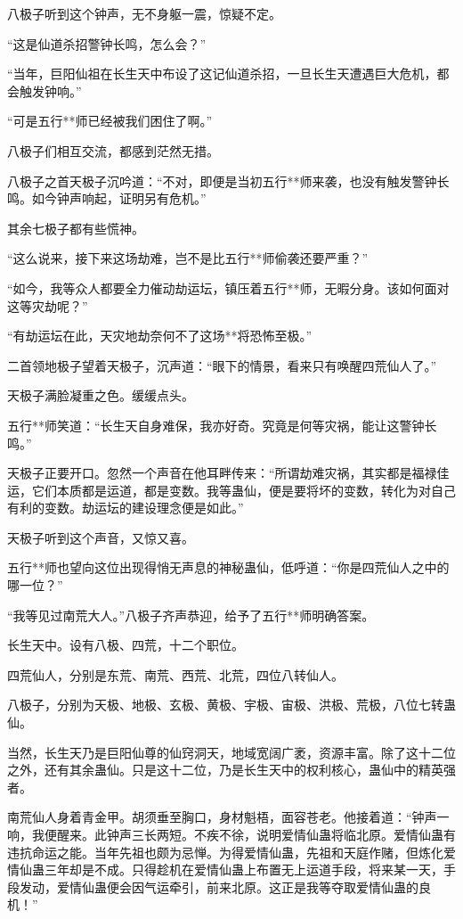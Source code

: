 \begin{this_body}
八极子听到这个钟声，无不身躯一震，惊疑不定。

“这是仙道杀招警钟长鸣，怎么会？”

“当年，巨阳仙祖在长生天中布设了这记仙道杀招，一旦长生天遭遇巨大危机，都会触发钟响。”

“可是五行**师已经被我们困住了啊。”

八极子们相互交流，都感到茫然无措。

八极子之首天极子沉吟道：“不对，即便是当初五行**师来袭，也没有触发警钟长鸣。如今钟声响起，证明另有危机。”

其余七极子都有些慌神。

“这么说来，接下来这场劫难，岂不是比五行**师偷袭还要严重？”

“如今，我等众人都要全力催动劫运坛，镇压着五行**师，无暇分身。该如何面对这等灾劫呢？”

“有劫运坛在此，天灾地劫奈何不了这场**将恐怖至极。”

二首领地极子望着天极子，沉声道：“眼下的情景，看来只有唤醒四荒仙人了。”

天极子满脸凝重之色。缓缓点头。

五行**师笑道：“长生天自身难保，我亦好奇。究竟是何等灾祸，能让这警钟长鸣。”

天极子正要开口。忽然一个声音在他耳畔传来：“所谓劫难灾祸，其实都是福禄佳运，它们本质都是运道，都是变数。我等蛊仙，便是要将坏的变数，转化为对自己有利的变数。劫运坛的建设理念便是如此。”

天极子听到这个声音，又惊又喜。

五行**师也望向这位出现得悄无声息的神秘蛊仙，低呼道：“你是四荒仙人之中的哪一位？”

“我等见过南荒大人。”八极子齐声恭迎，给予了五行**师明确答案。

长生天中。设有八极、四荒，十二个职位。

四荒仙人，分别是东荒、南荒、西荒、北荒，四位八转仙人。

八极子，分别为天极、地极、玄极、黄极、宇极、宙极、洪极、荒极，八位七转蛊仙。

当然，长生天乃是巨阳仙尊的仙窍洞天，地域宽阔广袤，资源丰富。除了这十二位之外，还有其余蛊仙。只是这十二位，乃是长生天中的权利核心，蛊仙中的精英强者。

南荒仙人身着青金甲。胡须垂至胸口，身材魁梧，面容苍老。他接着道：“钟声一响，我便醒来。此钟声三长两短。不疾不徐，说明爱情仙蛊将临北原。爱情仙蛊有违抗命运之能。当年先祖也颇为忌惮。为得爱情仙蛊，先祖和天庭作赌，但炼化爱情仙蛊三年却是不成。只得趁机在爱情仙蛊上布置无上运道手段，将来某一天，手段发动，爱情仙蛊便会因气运牵引，前来北原。这正是我等夺取爱情仙蛊的良机！”


\end{this_body}

